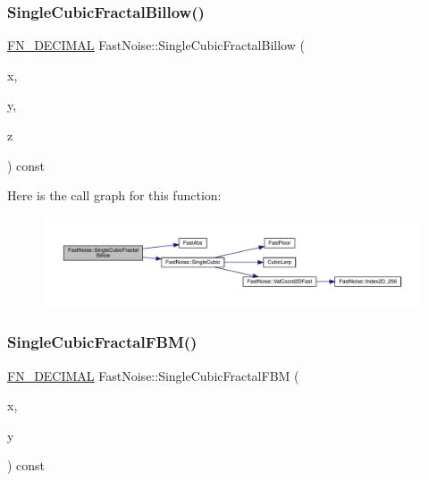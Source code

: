 \subsubsection{\texorpdfstring{Single\+Cubic\+Fractal\+Billow()}{SingleCubicFractalBillow()}\hspace{0.1cm}{\footnotesize\ttfamily [2/2]}}
{\footnotesize\ttfamily \mbox{\hyperlink{_fast_noise_8h_a75a9ef6d2541c4921815b885bfd449c3}{F\+N\+\_\+\+D\+E\+C\+I\+M\+AL}} Fast\+Noise\+::\+Single\+Cubic\+Fractal\+Billow (\begin{DoxyParamCaption}\item[{\mbox{\hyperlink{_fast_noise_8h_a75a9ef6d2541c4921815b885bfd449c3}{F\+N\+\_\+\+D\+E\+C\+I\+M\+AL}}}]{x,  }\item[{\mbox{\hyperlink{_fast_noise_8h_a75a9ef6d2541c4921815b885bfd449c3}{F\+N\+\_\+\+D\+E\+C\+I\+M\+AL}}}]{y,  }\item[{\mbox{\hyperlink{_fast_noise_8h_a75a9ef6d2541c4921815b885bfd449c3}{F\+N\+\_\+\+D\+E\+C\+I\+M\+AL}}}]{z }\end{DoxyParamCaption}) const\hspace{0.3cm}{\ttfamily [private]}}

Here is the call graph for this function\+:
\nopagebreak
\begin{figure}[H]
\begin{center}
\leavevmode
\includegraphics[width=350pt]{d1/dd8/class_fast_noise_a8595f37169b6133ccd822d21af3acd60_cgraph}
\end{center}
\end{figure}
\mbox{\label{class_fast_noise_a892cdc836d7704acfbf8c3680a1a2689}} 
\subsubsection{\texorpdfstring{Single\+Cubic\+Fractal\+F\+B\+M()}{SingleCubicFractalFBM()}\hspace{0.1cm}{\footnotesize\ttfamily [1/2]}}
{\footnotesize\ttfamily \mbox{\hyperlink{_fast_noise_8h_a75a9ef6d2541c4921815b885bfd449c3}{F\+N\+\_\+\+D\+E\+C\+I\+M\+AL}} Fast\+Noise\+::\+Single\+Cubic\+Fractal\+F\+BM (\begin{DoxyParamCaption}\item[{\mbox{\hyperlink{_fast_noise_8h_a75a9ef6d2541c4921815b885bfd449c3}{F\+N\+\_\+\+D\+E\+C\+I\+M\+AL}}}]{x,  }\item[{\mbox{\hyperlink{_fast_noise_8h_a75a9ef6d2541c4921815b885bfd449c3}{F\+N\+\_\+\+D\+E\+C\+I\+M\+AL}}}]{y }\end{DoxyParamCaption}) const\hspace{0.3cm}{\ttfamily [private]}}


